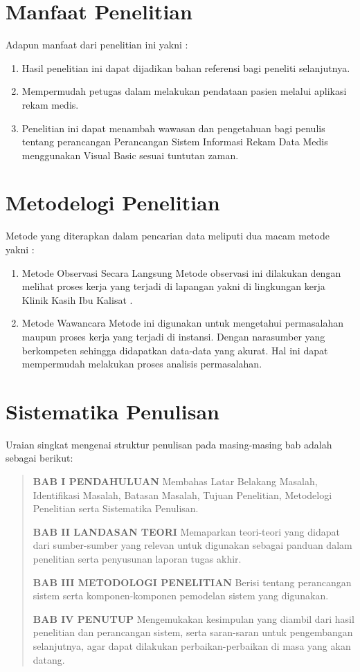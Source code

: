 \documentclass{jtetiproposalskripsi}
\begin{document}
\section{Manfaat Penelitian}
Adapun manfaat dari penelitian ini yakni :
\begin{enumerate}
\item Hasil penelitian ini dapat dijadikan bahan referensi bagi peneliti selanjutnya.
\item Mempermudah petugas dalam melakukan pendataan pasien melalui aplikasi rekam medis.
\item Penelitian ini dapat menambah wawasan dan pengetahuan bagi penulis tentang perancangan Perancangan Sistem Informasi Rekam Data Medis menggunakan Visual Basic sesuai tuntutan zaman.
\end{enumerate}

\section{Metodelogi Penelitian}
Metode yang diterapkan dalam pencarian data meliputi dua macam metode yakni :
\begin{enumerate}
\item Metode Observasi Secara Langsung Metode observasi ini dilakukan dengan melihat proses kerja yang terjadi di lapangan yakni di lingkungan kerja Klinik Kasih Ibu Kalisat .
\item Metode Wawancara Metode ini digunakan untuk mengetahui permasalahan maupun proses kerja yang terjadi di instansi. Dengan narasumber yang berkompeten sehingga didapatkan data-data yang akurat. Hal ini dapat mempermudah melakukan proses analisis permasalahan.
\end{enumerate}

\section{Sistematika Penulisan}
Uraian singkat mengenai struktur penulisan pada masing-masing bab adalah sebagai berikut:

\begin{quote}
\textbf {BAB I PENDAHULUAN}
Membahas Latar Belakang Masalah, Identifikasi Masalah, Batasan Masalah, Tujuan Penelitian, Metodelogi Penelitian serta Sistematika Penulisan.

\textbf {BAB II LANDASAN TEORI}
Memaparkan teori-teori yang didapat dari sumber-sumber yang relevan untuk digunakan sebagai panduan dalam penelitian serta penyusunan laporan tugas akhir.

\textbf {BAB III METODOLOGI PENELITIAN}
Berisi tentang perancangan sistem serta komponen-komponen pemodelan sistem yang digunakan.

\textbf {BAB IV PENUTUP}
Mengemukakan kesimpulan yang diambil dari hasil penelitian dan perancangan sistem, serta saran-saran untuk pengembangan selanjutnya, agar dapat dilakukan perbaikan-perbaikan di masa yang akan datang.

\end{quote}
\end{document}
